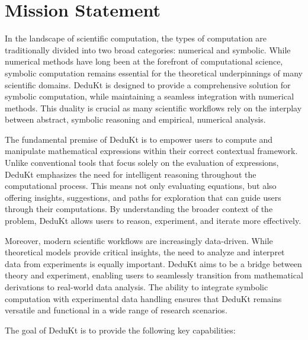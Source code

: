 \section{Mission Statement}\label{sec:mission-statement}
In the landscape of scientific computation, the types of computation are traditionally divided into two broad categories: numerical and symbolic.
While numerical methods have long been at the forefront of computational science, symbolic computation remains essential for the theoretical underpinnings of many scientific domains.
DeduKt is designed to provide a comprehensive solution for symbolic computation, while maintaining a seamless integration with numerical methods.
This duality is crucial as many scientific workflows rely on the interplay between abstract, symbolic reasoning and empirical, numerical analysis.

The fundamental premise of DeduKt is to empower users to compute and manipulate mathematical expressions within their correct contextual framework.
Unlike conventional tools that focus solely on the evaluation of expressions, DeduKt emphasizes the need for intelligent reasoning throughout the computational process.
This means not only evaluating equations, but also offering insights, suggestions, and paths for exploration that can guide users through their computations.
By understanding the broader context of the problem, DeduKt allows users to reason, experiment, and iterate more effectively.

Moreover, modern scientific workflows are increasingly data-driven.
While theoretical models provide critical insights, the need to analyze and interpret data from experiments is equally important.
DeduKt aims to be a bridge between theory and experiment, enabling users to seamlessly transition from mathematical derivations to real-world data analysis.
The ability to integrate symbolic computation with experimental data handling ensures that DeduKt remains versatile and functional in a wide range of research scenarios.

The goal of DeduKt is to provide the following key capabilities:

